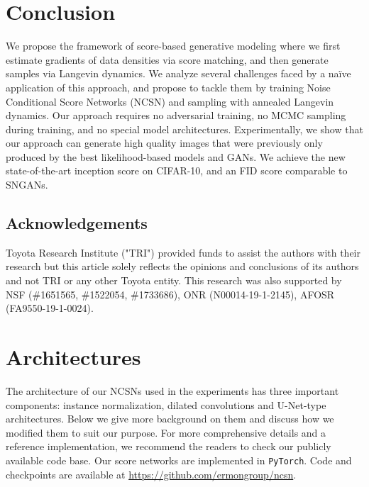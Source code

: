 \documentclass{article}
\begin{document}
 \section{Conclusion}
We propose the framework of score-based generative modeling where we first estimate gradients of data densities via score matching, and then generate samples via Langevin dynamics. We analyze several challenges faced by a na\"{i}ve application of this approach, and propose to tackle them by training Noise Conditional Score Networks (NCSN) and sampling with annealed Langevin dynamics. Our approach requires no adversarial training, no MCMC sampling during training, and no special model architectures. Experimentally, we show that our approach can generate high quality images that were previously only produced by the best likelihood-based models and GANs. We achieve the new state-of-the-art inception score on CIFAR-10, and an FID score comparable to SNGANs. 

\subsection*{Acknowledgements}
Toyota Research Institute ("TRI")  provided funds to assist the authors with their research but this article solely reflects the opinions and conclusions of its authors and not TRI or any other Toyota entity. This research was also supported by NSF (\#1651565, \#1522054, \#1733686), ONR  (N00014-19-1-2145), AFOSR (FA9550-19-1-0024). 
\newpage
\appendix
\section{Architectures}\label{app:arch}
The architecture of our NCSNs used in the experiments has three important components: instance normalization, dilated convolutions and U-Net-type architectures. Below we give more background on them and discuss how we modified them to suit our purpose. For more comprehensive details and a reference implementation, we recommend the readers to check our publicly available code base. Our score networks are implemented in \texttt{PyTorch}. Code and checkpoints are available at \href{https://github.com/ermongroup/ncsn}{\color{cyan} https://github.com/ermongroup/ncsn}.
\end{document}
